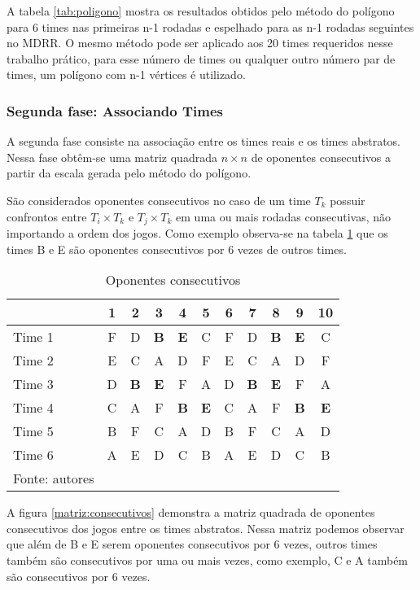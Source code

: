 \documentclass[12pt,a4paper]{article}
\begin{document}
A tabela \ref{tab:poligono} mostra os resultados obtidos pelo método do polígono para $6$ times nas primeiras n-1 rodadas e espelhado para as n-1 rodadas seguintes no MDRR. O mesmo método pode ser aplicado aos 20 times requeridos nesse trabalho prático, para esse número de times ou qualquer outro número par de times, um polígono com n-1 vértices é utilizado.

\subsubsection{Segunda fase: Associando Times}

A segunda fase consiste na associação entre os times reais e os times abstratos. Nessa fase obtêm-se uma matriz quadrada $n \times n$ de oponentes consecutivos a partir da escala gerada pelo método do polígono.

São considerados oponentes consecutivos no caso de um time $T_{k}$ possuir confrontos entre $T_{i} \times T_{k}$ e $T_{j} \times T_{k}$ em uma ou mais rodadas consecutivas, não importando a ordem dos jogos. Como exemplo observa-se na tabela \ref{tab:consecutivos} que os times B e E são oponentes consecutivos por 6 vezes de outros times.

\begin{table}[H]
	\centering
	\caption{Oponentes consecutivos}
	\label{tab:consecutivos}
	\begin{tabular}{l*{10}{c}}
		\toprule
		& 1 & 2 & 3 & 4 & 5 & 6 & 7 & 8 & 9 & 10 \\
		\midrule
		Time 1 & F & D & \textbf{B} & \textbf{E} & C & F & D & \textbf{B} & \textbf{E} & C \\
		Time 2 & E & C & A & D & F & E & C & A & D & F \\
		Time 3 & D & \textbf{B} & \textbf{E} & F & A & D & \textbf{B} & \textbf{E} & F & A \\
		Time 4 & C & A & F & \textbf{B} & \textbf{E} & C & A & F & \textbf{B} & \textbf{E} \\
		Time 5 & B & F & C & A & D & B & F & C & A & D \\
		Time 6 & A & E & D & C & B & A & E & D & C & B \\
		\bottomrule
		\footnotesize Fonte: autores
	\end{tabular}
\end{table}

A figura \ref{matriz:consecutivos} demonstra a matriz quadrada de oponentes consecutivos dos jogos entre os times abstratos. Nessa matriz podemos observar que além de B e E serem oponentes consecutivos por 6 vezes, outros times também são consecutivos por uma ou mais vezes, como exemplo, C e A também são consecutivos por 6 vezes.
\end{document}
